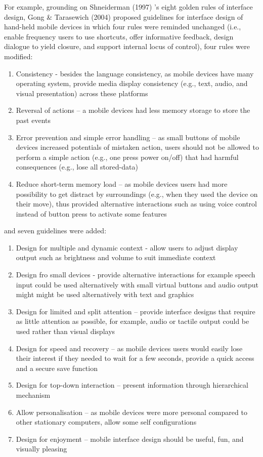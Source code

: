 For example, grounding on Shneiderman (1997) \cite{shneiderman2010designing}'s eight golden rules of interface design, Gong \& Tarasewich (2004) \cite{gong2004guidelines} proposed guidelines for interface design of hand-held mobile devices in which four rules were reminded unchanged (i.e., enable frequency users to use shortcuts, offer informative feedback, design dialogue to yield closure, and support internal locus of control), four rules were modified: 
\begin{enumerate} 
\item Consistency - besides the language consistency, as mobile devices have many operating system, provide media display consistency (e.g., text, audio, and visual presentation) across these platforms 
\item Reversal of actions – a mobile devices had less memory storage to store the past events
\item Error prevention and simple error handling – as small buttons of mobile devices increased potentials of mistaken action, users should not be allowed to perform a simple action (e.g., one press power on/off) that had harmful consequences (e.g., lose all stored-data)
\item Reduce short-term memory load – as mobile devices users had more possibility to get distract by surroundings (e.g., when they used the device on their move), thus provided alternative interactions such as using voice control instead of button press to activate some features
\end{enumerate} 

and seven guidelines were added: 

\begin{enumerate} 
\item Design for multiple and dynamic context - allow users to adjust display output such as brightness and volume to suit immediate context
\item Design fro small devices - provide alternative interactions for example speech input could be used alternatively with small virtual buttons and audio output might might be used alternatively with text and graphics
\item Design for limited and split attention – provide interface designs that require as little attention as possible, for example, audio or tactile output could be used rather than visual displays
\item Design for speed and recovery – as mobile devices users would easily lose their interest if they needed to wait for a few seconds, provide a quick access and a secure save function
\item Design for top-down interaction – present information through hierarchical mechanism
\item Allow personalisation – as mobile devices were more personal compared to other stationary computers, allow some self configurations
\item Design for enjoyment – mobile interface design should be useful, fun, and visually pleasing
\end{enumerate} 

